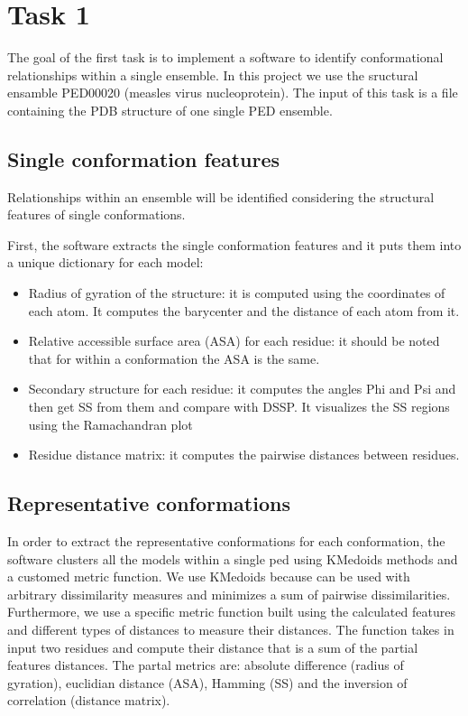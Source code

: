 \section{Task 1}\label{sec:task1}

The goal of the first task is to implement a software to identify conformational relationships within a single ensemble. In this project we use the sructural ensamble PED00020 (measles virus nucleoprotein).
The input of this task is a file containing the PDB structure of one single PED ensemble.

\subsection{Single conformation features}
Relationships within an ensemble will be identified considering the structural features of single conformations.

First, the software extracts the single conformation features and it puts them into a unique dictionary for each model:
\begin{itemize}
\item Radius of gyration of the structure: it is computed using the coordinates of each atom. It computes the barycenter and the distance of each atom from it.
\item Relative accessible surface area (ASA) for each residue: it should be noted that for within a conformation the ASA is the same.
\item Secondary structure for each residue: it computes the angles Phi and Psi and then get SS from them and compare with DSSP. It visualizes the SS regions using the Ramachandran plot
\item Residue distance matrix: it computes the pairwise distances between residues.
\end{itemize}


\subsection{Representative conformations}
In order to extract the representative conformations for each conformation, the software clusters all the models within a single ped using KMedoids methods and a customed metric function. 
We use KMedoids because can be used with arbitrary dissimilarity measures and minimizes a sum of pairwise dissimilarities. 
Furthermore, we use a specific metric function built using the calculated features and different types of distances to measure their distances. The function takes in input two residues and compute their distance that is a sum of the partial features distances.
The partal metrics are: absolute difference (radius of gyration), euclidian distance (ASA), Hamming (SS) and the inversion of correlation (distance matrix). 

